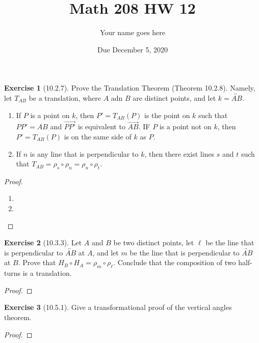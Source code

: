 \documentclass[11pt]{article}		%
\title{Math 208 HW 12}
\author{Your name goes here}  %
\date{Due December 5, 2020}
\newcommand{\lin}[1]{\overleftrightarrow{#1}}
\newcommand{\ray}[1]{\overrightarrow{#1}}
\theoremstyle{definition}
\newtheorem*{ex}{Exercise}
\begin{document}
	\maketitle
	
	



\begin{ex}[10.2.7]  Prove the Translation Theorem (Theorem 10.2.8).  Namely, let $T_{AB}$ be a translation, where $A$ adn $B$ are distinct points, and let $k = \lin{AB}$.
	\begin{enumerate}
		\item If $P$ is a point on $k$, then $P' = T_{AB}(P)$ is the point on $k$ such that $P P' = A B$ and $\ray{P P'}$ is equivalent to $\ray{AB}$. IF $P$ is a point not on $k$, then $P' = T_{AB}(P)$ is on the same side of $k$ as $P$.
		\item If $n$ is any line that is perpendicular to $k$, then there exist lines $s$ and $t$ such that $T_{AB} = \rho_s \circ \rho_n = \rho_n \circ \rho_t$.
	\end{enumerate}
	
	
\end{ex}

\begin{proof} $\,$
	\begin{enumerate}
		\item 
		\item 
	\end{enumerate}
	
\end{proof}


\vspace{1in} %





\begin{ex}[10.3.3]  Let $A$ and $B$ be two distinct points, let $\ell$ be the line that is perpendicular to $\lin{AB}$ at $A$, and let $m$ be the line that is perpendicular to $\lin{AB}$ at $B$.  Prove that $H_B \circ H_A = \rho_m \circ \rho_\ell$.  Conclude that the composition of two half-turns is a translation.
	
	
\end{ex}

\begin{proof} 
	
\end{proof}


\vspace{1in} %








\begin{ex}[10.5.1] Give a transformational proof of the vertical angles theorem.
	
	
\end{ex}

\begin{proof} 
	
\end{proof}


\vspace{1in} %
\end{document}
